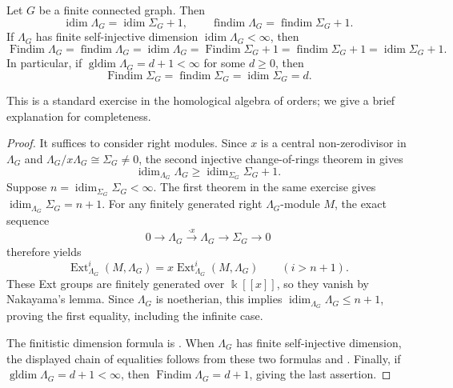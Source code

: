 \documentclass[a4paper,leqno]{amsart}
\begin{document}
\begin{prop}\label{prop:homological-dimensions-tiled-order}
Let $G$ be a finite connected graph.  Then
\[
\operatorname{idim}\Lambda_G
=\operatorname{idim}\Sigma_G+1, \qquad
\operatorname{findim}\Lambda_G
=\operatorname{findim}\Sigma_G+1.
\]
If $\Lambda_G$ has finite self-injective dimension  $\operatorname{idim}\Lambda_G<\infty$, then
$$\operatorname{Findim}\Lambda_G
=\operatorname{findim}\Lambda_G
=\operatorname{idim}\Lambda_G
=\operatorname{Findim}\Sigma_G+1
=\operatorname{findim}\Sigma_G+1
=\operatorname{idim}\Sigma_G+1.$$
In particular, if $\operatorname{gldim}\Lambda_G=d+1<\infty$ for some $d\ge 0$, then
\[
\operatorname{Findim}\Sigma_G=\operatorname{findim}\Sigma_G=\operatorname{idim}\Sigma_G=d.
\]
\end{prop}
This is a standard exercise in the homological algebra of orders; we give a brief explanation for completeness.
\begin{proof}
It suffices to consider right modules. Since $x$ is a central non-zerodivisor in $\Lambda_G$ and $\Lambda_G/x\Lambda_G\cong\Sigma_G\neq0$, the second injective change-of-rings theorem in \cite[Exercise~4.3.3]{Wei94} gives
\[
 \operatorname{idim}_{\Lambda_G}\Lambda_G
 \geq\operatorname{idim}_{\Sigma_G}\Sigma_G+1.
\]
Suppose $n=\operatorname{idim}_{\Sigma_G}\Sigma_G<\infty$. The first theorem in the same exercise gives $\operatorname{idim}_{\Lambda_G}\Sigma_G=n+1$. For any finitely generated right $\Lambda_G$-module $M$, the exact sequence
\[
 0\longrightarrow\Lambda_G\xrightarrow{\cdot x}\Lambda_G
 \longrightarrow\Sigma_G\longrightarrow0
\]
therefore yields
\[
 \operatorname{Ext}^i_{\Lambda_G}(M,\Lambda_G)
 =x\operatorname{Ext}^i_{\Lambda_G}(M,\Lambda_G)
 \qquad(i>n+1).
\]
These Ext groups are finitely generated over $\Bbbk[[x]]$, so they vanish by Nakayama's lemma. Since $\Lambda_G$ is noetherian, this implies $\operatorname{idim}_{\Lambda_G}\Lambda_G\leq n+1$, proving the first equality, including the infinite case.

The finitistic dimension formula is \cite[Proposition~4.1]{GHZ98}. When $\Lambda_G$ has finite self-injective dimension, the displayed chain of equalities follows from these two formulas and \cite[Propositions~1.2 and~1.3]{GHZ98}. Finally, if $\operatorname{gldim}\Lambda_G=d+1<\infty$, then $\operatorname{Findim}\Lambda_G=d+1$, giving the last assertion.
\end{proof}

\end{document}
